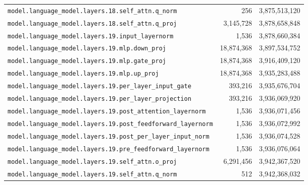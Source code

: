 \documentclass[10pt,a4paper]{article}
\theoremstyle{definition}
\begin{document}
\begin{appendices}
\begin{longtable}{p{9.5cm}rr}
\texttt{model.\allowbreak{}language\_model.\allowbreak{}layers.\allowbreak{}18.\allowbreak{}self\_attn.\allowbreak{}q\_norm} & 256 & 3,875,513,120 \\
\texttt{model.\allowbreak{}language\_model.\allowbreak{}layers.\allowbreak{}18.\allowbreak{}self\_attn.\allowbreak{}q\_proj} & 3,145,728 & 3,878,658,848 \\
\texttt{model.\allowbreak{}language\_model.\allowbreak{}layers.\allowbreak{}19.\allowbreak{}input\_layernorm} & 1,536 & 3,878,660,384 \\
\texttt{model.\allowbreak{}language\_model.\allowbreak{}layers.\allowbreak{}19.\allowbreak{}mlp.\allowbreak{}down\_proj} & 18,874,368 & 3,897,534,752 \\
\texttt{model.\allowbreak{}language\_model.\allowbreak{}layers.\allowbreak{}19.\allowbreak{}mlp.\allowbreak{}gate\_proj} & 18,874,368 & 3,916,409,120 \\
\texttt{model.\allowbreak{}language\_model.\allowbreak{}layers.\allowbreak{}19.\allowbreak{}mlp.\allowbreak{}up\_proj} & 18,874,368 & 3,935,283,488 \\
\texttt{model.\allowbreak{}language\_model.\allowbreak{}layers.\allowbreak{}19.\allowbreak{}per\_layer\_input\_gate} & 393,216 & 3,935,676,704 \\
\texttt{model.\allowbreak{}language\_model.\allowbreak{}layers.\allowbreak{}19.\allowbreak{}per\_layer\_projection} & 393,216 & 3,936,069,920 \\
\texttt{model.\allowbreak{}language\_model.\allowbreak{}layers.\allowbreak{}19.\allowbreak{}post\_attention\_layernorm} & 1,536 & 3,936,071,456 \\
\texttt{model.\allowbreak{}language\_model.\allowbreak{}layers.\allowbreak{}19.\allowbreak{}post\_feedforward\_layernorm} & 1,536 & 3,936,072,992 \\
\texttt{model.\allowbreak{}language\_model.\allowbreak{}layers.\allowbreak{}19.\allowbreak{}post\_per\_layer\_input\_norm} & 1,536 & 3,936,074,528 \\
\texttt{model.\allowbreak{}language\_model.\allowbreak{}layers.\allowbreak{}19.\allowbreak{}pre\_feedforward\_layernorm} & 1,536 & 3,936,076,064 \\
\texttt{model.\allowbreak{}language\_model.\allowbreak{}layers.\allowbreak{}19.\allowbreak{}self\_attn.\allowbreak{}o\_proj} & 6,291,456 & 3,942,367,520 \\
\texttt{model.\allowbreak{}language\_model.\allowbreak{}layers.\allowbreak{}19.\allowbreak{}self\_attn.\allowbreak{}q\_norm} & 512 & 3,942,368,032 \\

\end{longtable}
\end{appendices}
\end{document}
